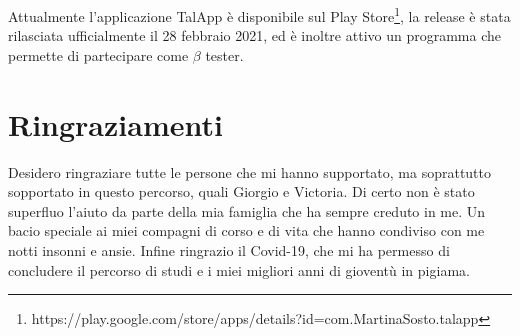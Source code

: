 \documentclass[12pt,a4paper,openright,twoside]{report}
\begin{document}
Attualmente l’applicazione TalApp è disponibile sul Play Store\footnote{ https://play.google.com/store/apps/details?id=com.MartinaSosto.talapp}, la release è stata rilasciata ufficialmente il 28 febbraio 2021, ed è inoltre attivo un programma che permette di partecipare come $\beta$ tester. 





\clearpage{\pagestyle{empty}\cleardoublepage}

\chapter*{Ringraziamenti}
\thispagestyle{empty}
Desidero ringraziare tutte le persone che mi hanno supportato, ma soprattutto sopportato in questo percorso, quali Giorgio e Victoria. Di certo non è stato superfluo l'aiuto da parte della mia famiglia che ha sempre creduto in me. Un bacio speciale ai miei compagni di corso e di vita che hanno condiviso con me notti insonni e ansie. Infine ringrazio il Covid-19, che mi ha permesso di concludere il percorso di studi e i miei migliori anni di gioventù in pigiama.
\end{document}
